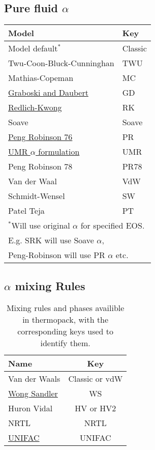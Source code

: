 \documentclass[english]{thermomemo}
\newcommand{\mathsec}[1]{\texorpdfstring{#1}{TEXT}} %
\begin{document}
\subsection{Pure fluid \mathsec{$\alpha$}}
\begin{table}[ht!]
  \centering
  \begin{tabular}{l l}
    \toprule
    Model & Key \\
    \midrule
    Model default$^*$ & Classic\\
    Twu-Coon-Bluck-Cunninghan & TWU\\
    Mathias-Copeman & MC\\
    \href{https://pubs.acs.org/doi/abs/10.1021/i260068a009}{Graboski and Daubert} & GD\\
    \href{https://doi.org/10.1021/cr60137a013}{Redlich-Kwong} & RK\\
    Soave & Soave\\
    \href{https://doi.org/10.1021/i160057a011}{Peng Robinson 76} & PR\\
    \href{https://doi.org/10.1021/ie049580p}{UMR $\alpha$ formulation} & UMR\\
    Peng Robinson 78 & PR78\\
    Van der Waal & VdW\\
    Schmidt-Wensel & SW\\
    Patel Teja & PT\\
    \bottomrule
    \multicolumn{2}{l}{$^*$Will use original $\alpha$ for specified EOS.}\\
    \multicolumn{2}{l}{ E.g. SRK will use Soave $\alpha$,}\\
    \multicolumn{2}{l}{ Peng-Robinson will use PR $\alpha$ etc.}\\
  \end{tabular}
\end{table}

\subsection{\mathsec{$\alpha$} mixing Rules}
\begin{table}[ht!]
  \centering
  \begin{tabular}{l c}
    \toprule
    Name & Key \\
    \midrule
    Van der Waals & Classic or vdW\\
    \href{https://github.com/SINTEF/thermopack/tree/main/doc/memo/WongSandler/wongsandler.pdf}{Wong Sandler} & WS \\
    Huron Vidal & HV or HV2 \\
    NRTL & NRTL \\
    \href{https://github.com/SINTEF/thermopack/tree/main/doc/memo/UNIFAC/unifac.pdf}{UNIFAC} & UNIFAC \\
    \bottomrule
  \end{tabular}
  \caption{Mixing rules and phases availible in thermopack, with the corresponding keys used to identify them.}
  \label{tab:mixing_rules_thermopack}
\end{table}
\end{document}
